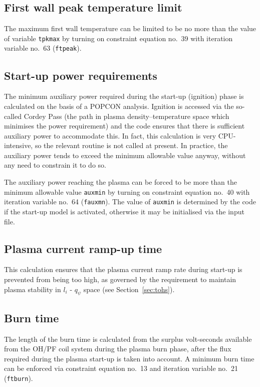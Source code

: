 \documentclass[11pt,a4paper]{report}
\begin{document}
\subsection{First wall peak temperature limit}

The maximum first wall temperature can be limited to be no more than the value
of variable \texttt{tpkmax} by turning on constraint equation no.\ 39 with
iteration variable no.\ 63 (\texttt{ftpeak}).

\subsection{Start-up power requirements}

The minimum auxiliary power required during the start-up (ignition) phase is
calculated on the basis of a POPCON analysis. Ignition is accessed via the
so-called Cordey Pass (the path in plasma density--temperature space which
minimises the power requirement) and the code ensures that there is sufficient
auxiliary power to accommodate this. In fact, this calculation is very
CPU-intensive, so the relevant routine is not called at present. In practice,
the auxiliary power tends to exceed the minimum allowable value anyway,
without any need to constrain it to do so.

The auxiliary power reaching the plasma can be forced to be more than the
minimum allowable value \texttt{auxmin} by turning on constraint equation no.\
40 with iteration variable no.\ 64 (\texttt{fauxmn}). The value of
\texttt{auxmin} is determined by the code if the start-up model is activated,
otherwise it may be initialised via the input file.

\subsection{Plasma current ramp-up time}

This calculation ensures that the plasma current ramp rate during start-up is
prevented from being too high, as governed by the requirement to maintain
plasma stability in $l_i$ - $q_\psi$ space (see Section~\ref{sec:tohs}).

\subsection{Burn time}

The length of the burn time is calculated from the surplus volt-seconds
available from the OH/PF coil system during the plasma burn phase, after the
flux required during the plasma start-up is taken into account. A minimum burn
time can be enforced via constraint equation no.\ 13 and iteration variable
no.\ 21 (\texttt{ftburn}).
\end{document}
